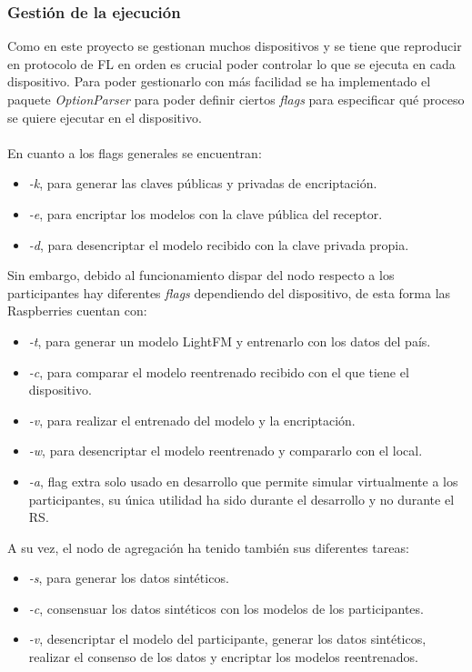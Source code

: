 \subsubsection{Gestión de la ejecución}
Como en este proyecto se gestionan muchos dispositivos y se tiene que reproducir en protocolo de FL en orden es crucial poder controlar lo que se ejecuta en cada dispositivo. Para poder gestionarlo con más facilidad se ha implementado el paquete \textit{OptionParser} para poder definir ciertos \textit{flags} para especificar qué proceso se quiere ejecutar en el dispositivo.
\\ \\
En cuanto a los flags generales se encuentran:
\begin{itemize}
    \item \textit{-k}, para generar las claves públicas y privadas de encriptación.
    \item \textit{-e}, para encriptar los modelos con la clave pública del receptor.
    \item \textit{-d}, para desencriptar el modelo recibido con la clave privada propia.
\end{itemize}   
Sin embargo, debido al funcionamiento dispar del nodo respecto a los participantes hay diferentes \textit{flags} dependiendo del dispositivo, de esta forma las Raspberries cuentan con:
\begin{itemize}
    \item \textit{-t}, para generar un modelo LightFM y entrenarlo con los datos del país.
    \item \textit{-c}, para comparar el modelo reentrenado recibido con el que tiene el dispositivo.
    \item \textit{-v}, para realizar el entrenado del modelo y la encriptación.
    \item \textit{-w}, para desencriptar el modelo reentrenado y compararlo con el local.
    \item \textit{-a}, flag extra solo usado en desarrollo que permite simular virtualmente a los participantes, su única utilidad ha sido durante el desarrollo y no durante el RS.
\end{itemize}
A su vez, el nodo de agregación ha tenido también sus diferentes tareas:
\begin{itemize}
    \item \textit{-s}, para generar los datos sintéticos.
    \item \textit{-c}, consensuar los datos sintéticos con los modelos de los participantes.
    \item \textit{-v}, desencriptar el modelo del participante, generar los datos sintéticos, realizar el consenso de los datos y encriptar los modelos reentrenados.
\end{itemize}
